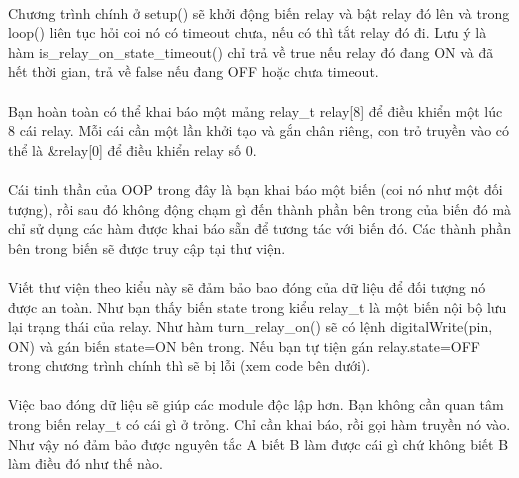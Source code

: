 \documentclass[12pt,a5paper]{book}
\begin{document}
\paragraph{}
Chương trình chính ở setup() sẽ khởi động biến relay và bật relay đó lên và trong loop() liên tục hỏi coi nó có timeout chưa, nếu có thì tắt relay đó đi. Lưu ý là hàm is\_relay\_on\_state\_timeout() chỉ trả về true nếu relay đó đang ON và đã hết thời gian, trả về false nếu đang OFF hoặc chưa timeout.
\paragraph{}
Bạn hoàn toàn có thể khai báo một mảng relay\_t relay[8] để điều khiển một lúc 8 cái relay. Mỗi cái cần một lần khởi tạo và gắn chân riêng, con trỏ truyền vào có thể là \&relay[0] để điều khiển relay số 0.
\paragraph{}
Cái tinh thần của OOP trong đây là bạn khai báo một biến (coi nó như một đối tượng), rồi sau đó không động chạm gì đến thành phần bên trong của biến đó mà chỉ sử dụng các hàm được khai báo sẵn để tương tác với biến đó. Các thành phần bên trong biến sẽ được truy cập tại thư viện. 
\paragraph{}
Viết thư viện theo kiểu này sẽ đảm bảo bao đóng của dữ liệu để đối tượng nó được an toàn. Như bạn thấy biến state trong kiểu relay\_t là một biến nội bộ lưu lại trạng thái của relay. Như hàm turn\_relay\_on() sẽ có lệnh digitalWrite(pin, ON) và gán biến state=ON bên trong. Nếu bạn tự tiện gán relay.state=OFF trong chương trình chính thì sẽ bị lỗi (xem code bên dưới).
\paragraph{}
Việc bao đóng dữ liệu sẽ giúp các module độc lập hơn. Bạn không cần quan tâm trong biến relay\_t có cái gì ở trỏng. Chỉ cần khai báo, rồi gọi hàm truyền nó vào. Như vậy nó đảm bảo được nguyên tắc A biết B làm được cái gì chứ không biết B làm điều đó như thế nào.
\end{document}
